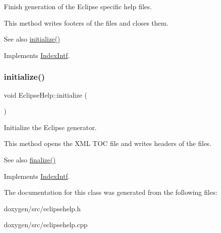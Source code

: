 Finish generation of the Eclipse specific help files. 

This method writes footers of the files and closes them. \begin{DoxySeeAlso}{See also}
\mbox{\hyperlink{class_eclipse_help_aefada9c9b474d36ef9b771e2361c8dc1}{initialize()}} 
\end{DoxySeeAlso}


Implements \mbox{\hyperlink{class_index_intf}{Index\+Intf}}.

\mbox{\label{class_eclipse_help_aefada9c9b474d36ef9b771e2361c8dc1}} 
\subsubsection{\texorpdfstring{initialize()}{initialize()}}
{\footnotesize\ttfamily void Eclipse\+Help\+::initialize (\begin{DoxyParamCaption}{ }\end{DoxyParamCaption})\hspace{0.3cm}{\ttfamily [virtual]}}



Initialize the Eclipse generator. 

This method opens the X\+ML T\+OC file and writes headers of the files. \begin{DoxySeeAlso}{See also}
\mbox{\hyperlink{class_eclipse_help_a6a8532316d47986f371459e6b09b9d71}{finalize()}} 
\end{DoxySeeAlso}


Implements \mbox{\hyperlink{class_index_intf}{Index\+Intf}}.



The documentation for this class was generated from the following files\+:\begin{DoxyCompactItemize}
\item 
doxygen/src/eclipsehelp.\+h\item 
doxygen/src/eclipsehelp.\+cpp\end{DoxyCompactItemize}
